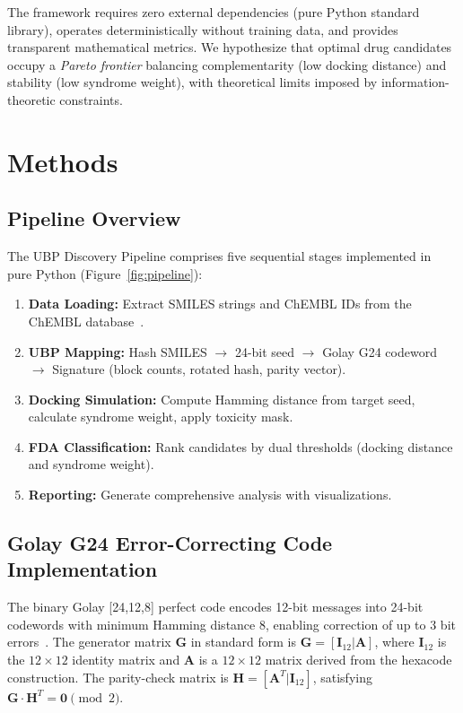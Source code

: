 \documentclass[12pt,a4paper]{article}
\begin{document}
The framework requires zero external dependencies (pure Python standard library), operates deterministically without training data, and provides transparent mathematical metrics. We hypothesize that optimal drug candidates occupy a \textit{Pareto frontier} balancing complementarity (low docking distance) and stability (low syndrome weight), with theoretical limits imposed by information-theoretic constraints.

\section{Methods}

\subsection{Pipeline Overview}

The UBP Discovery Pipeline comprises five sequential stages implemented in pure Python (Figure~\ref{fig:pipeline}):

\begin{enumerate}
\item \textbf{Data Loading:} Extract SMILES strings and ChEMBL IDs from the ChEMBL database~\cite{ChEMBL2024}.
\item \textbf{UBP Mapping:} Hash SMILES $\rightarrow$ 24-bit seed $\rightarrow$ Golay G24 codeword $\rightarrow$ Signature (block counts, rotated hash, parity vector).
\item \textbf{Docking Simulation:} Compute Hamming distance from target seed, calculate syndrome weight, apply toxicity mask.
\item \textbf{FDA Classification:} Rank candidates by dual thresholds (docking distance and syndrome weight).
\item \textbf{Reporting:} Generate comprehensive analysis with visualizations.
\end{enumerate}

\subsection{Golay G24 Error-Correcting Code Implementation}

The binary Golay [24,12,8] perfect code encodes 12-bit messages into 24-bit codewords with minimum Hamming distance 8, enabling correction of up to 3 bit errors~\cite{Golay1949,MacWilliams1977}. The generator matrix $\mathbf{G}$ in standard form is $\mathbf{G} = [\mathbf{I}_{12} | \mathbf{A}]$, where $\mathbf{I}_{12}$ is the $12 \times 12$ identity matrix and $\mathbf{A}$ is a $12 \times 12$ matrix derived from the hexacode construction. The parity-check matrix is $\mathbf{H} = [\mathbf{A}^T | \mathbf{I}_{12}]$, satisfying $\mathbf{G} \cdot \mathbf{H}^T = \mathbf{0} \pmod{2}$.
\end{document}
